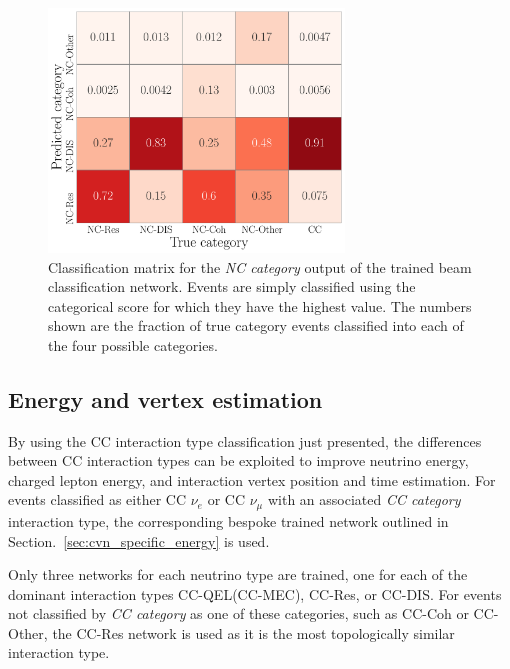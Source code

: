 \begin{figure} %
    \includegraphics[width=0.7\textwidth]{diagrams/6-cvn/chipsnet/final_nc_cat_confusion.pdf}
    \caption[Classification matrix for the NC category output of the beam classification network.]
    {Classification matrix for the \emph{NC category} output of the trained beam classification
        network. Events are simply classified using the categorical score for which they have the
        highest value. The numbers shown are the fraction of true category events classified into
        each of the four possible categories.}
    \label{fig:final_nc_cat_confusion}
\end{figure}

\subsection{Energy and vertex estimation} %
\label{sec:cvn_results_energy} %

By using the CC interaction type classification just presented, the differences between CC
interaction types can be exploited to improve neutrino energy, charged lepton energy, and
interaction vertex position and time estimation. For events classified as either CC $\nu_{e}$ or
CC $\nu_{\mu}$ with an associated \emph{CC category} interaction type, the corresponding bespoke
trained network outlined in Section.~\ref{sec:cvn_specific_energy} is used.

Only three networks for each neutrino type are trained, one for each of the dominant interaction
types CC-QEL(CC-MEC), CC-Res, or CC-DIS. For events not classified by \emph{CC category} as one of
these categories, such as CC-Coh or CC-Other, the CC-Res network is used as it is the most
topologically similar interaction type.

